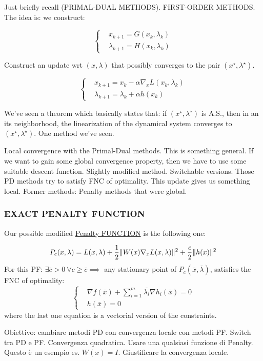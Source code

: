 Just briefly recall (PRIMAL-DUAL METHODS). FIRST-ORDER METHODS. The idea is: we construct:

\[ 	
	\left\{
	\begin{aligned}
	&x_{k+1} = G(x_k,\lambda_k)\\
	&\lambda_{k+1} = H(x_k,\lambda_k)
	\end{aligned}
	\right.
\]

Construct an update wrt $(x,\lambda)$ that possibly converges to the pair $(x^\star,\lambda^\star)$.

\[
	\left\{
	\begin{aligned}
	&x_{k+1} = x_{k} - \alpha\nabla_x{L(x_k,\lambda_k)}\\
	&\lambda_{k+1} = \lambda_k +\alpha h(x_k)
	\end{aligned}
	\right.
\]

We've seen a theorem which basically states that: if $(x^\star,\lambda^\star)$ is A.S., then in an its neighborhood, the linearization of the dynamical system converges to $(x^\star,\lambda^\star)$. One method we've seen.

Local convergence with the Primal-Dual methods. This is something general. If we want to gain some global convergence property, then we have to use some suitable descent function. Slightly modified method. Switchable versions. Those PD methods try to satisfy FNC of optimality. This update gives us something local. Former methods: Penalty methods that were global.

\subsubsection{EXACT PENALTY FUNCTION}

Our possible modified \underline{Penalty FUNCTION} is the following one:

\[
	P_c(x,\lambda) = L(x,\lambda) + \frac{1}{2}\lVert W(x)\nabla_x{L(x,\lambda)}\rVert^2 + \frac{c}{2}\lVert h(x)\rVert^2
\]
For this PF: $\exists \bar{c}>0\ \forall c\geq\bar{c} \implies$ any stationary point of $P_c(\bar{x},\bar{\lambda})$, satisfies the FNC of optimality:
\[
	\left\{
	\begin{aligned}
	&\nabla{f(\bar{x})} + \sum_{i=1}^m{\bar{\lambda_i}\nabla{h_i(\bar{x})}} = 0\\
	&h(\bar{x}) = 0
	\end{aligned}
	\right.
\]
where the last one equation is a vectorial version of the constraints. 

Obiettivo: cambiare metodi PD con convergenza locale con metodi PF. Switch tra PD e PF. Convergenza quadratica. Usare una qualsiasi funzione di Penalty. Questo è un esempio es. $W(x)=I$. Giustificare la convergenza locale.

